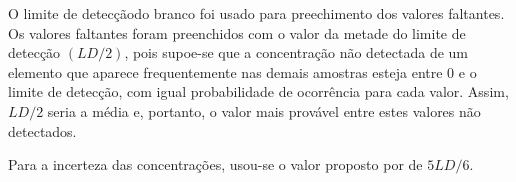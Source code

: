 O limite de detecçãodo branco foi usado para preechimento dos valores faltantes.  
Os valores faltantes foram preenchidos com o valor da metade do 
limite de detecção $(LD/2)$, pois supoe-se que a concentração não 
detectada de um elemento que aparece frequentemente nas demais amostras 
esteja entre 0 e o limite de detecção, com igual probabilidade de ocorrência 
para cada valor. Assim, $LD/2$ seria a média e, portanto, o valor mais 
provável entre estes valores não detectados. 

Para a incerteza das concentrações, usou-se o valor proposto por
\citep{polissar1998} de $5LD/6$.

